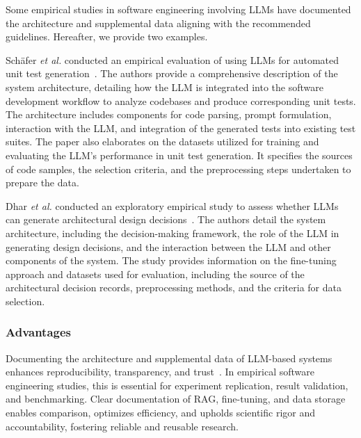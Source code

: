 Some empirical studies in software engineering involving LLMs have documented the architecture and supplemental data aligning with the recommended guidelines. Hereafter, we provide two examples.


Sch{\"{a}}fer \textit{et al.} conducted an empirical evaluation of using LLMs for automated unit test generation~\cite{DBLP:journals/tse/SchaferNET24}. The authors provide a comprehensive description of the system architecture, detailing how the LLM is integrated into the software development workflow to analyze codebases and produce corresponding unit tests. The architecture includes components for code parsing, prompt formulation, interaction with the LLM, and integration of the generated tests into existing test suites. The paper also elaborates on the datasets utilized for training and evaluating the LLM's performance in unit test generation. It specifies the sources of code samples, the selection criteria, and the preprocessing steps undertaken to prepare the data.

Dhar \textit{et al.} conducted an exploratory empirical study to assess whether LLMs can generate architectural design decisions~\cite{DBLP:conf/icsa/DharVV24}. The authors detail the system architecture, including the decision-making framework, the role of the LLM in generating design decisions, and the interaction between the LLM and other components of the system. The study provides information on the fine-tuning approach and datasets used for evaluation, including the source of the architectural decision records, preprocessing methods, and the criteria for data selection. 

\subsubsection{Advantages}

Documenting the architecture and supplemental data of LLM-based systems enhances reproducibility, transparency, and trust~\cite{DBLP:journals/software/LuZXXW24}. In empirical software engineering studies, this is essential for experiment replication, result validation, and benchmarking. Clear documentation of RAG, fine-tuning, and data storage enables comparison, optimizes efficiency, and upholds scientific rigor and accountability, fostering reliable and reusable research.

